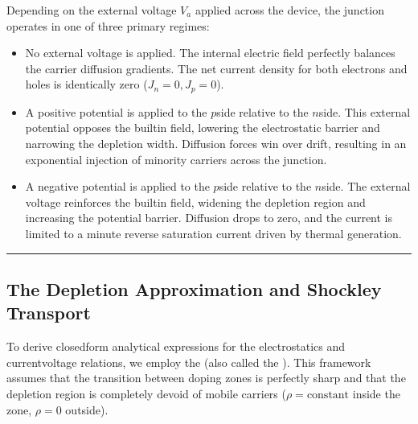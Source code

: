 \documentclass[letterpaper,10pt,english]{jupyterBook}
\begin{document}
\sphinxAtStartPar
Depending on the external voltage \(V_a\) applied across the device, the junction operates in one of three primary regimes:
\begin{itemize}
\item {} 
\sphinxAtStartPar
{} No external voltage is applied. The internal electric field perfectly balances the carrier diffusion gradients. The net current density for both electrons and holes is identically zero (\(J_n = 0, J_p = 0\)).

\item {} 
\sphinxAtStartPar
{} A positive potential is applied to the \(p\)\sphinxhyphen{}side relative to the \(n\)\sphinxhyphen{}side. This external potential opposes the built\sphinxhyphen{}in field, lowering the electrostatic barrier and narrowing the depletion width. Diffusion forces win over drift, resulting in an exponential injection of minority carriers across the junction.

\item {} 
\sphinxAtStartPar
{} A negative potential is applied to the \(p\)\sphinxhyphen{}side relative to the \(n\)\sphinxhyphen{}side. The external voltage reinforces the built\sphinxhyphen{}in field, widening the depletion region and increasing the potential barrier. Diffusion drops to zero, and the current is limited to a minute reverse saturation current driven by thermal generation.

\end{itemize}


\bigskip\hrule\bigskip



\subsection{The Depletion Approximation and Shockley Transport}
\label{\detokenize{ch/solid-state/semiconductors-pn-junctions:the-depletion-approximation-and-shockley-transport}}\label{\detokenize{ch/solid-state/semiconductors-pn-junctions:semiconductors-pn-junctions-depletion-approximation}}
\sphinxAtStartPar
To derive closed\sphinxhyphen{}form analytical expressions for the electrostatics and current\sphinxhyphen{}voltage relations, we employ the  (also called the ). This framework assumes that the transition between doping zones is perfectly sharp and that the depletion region is completely devoid of mobile carriers (\(\rho = \text{constant}\) inside the zone, \(\rho = 0\) outside).
\end{document}
